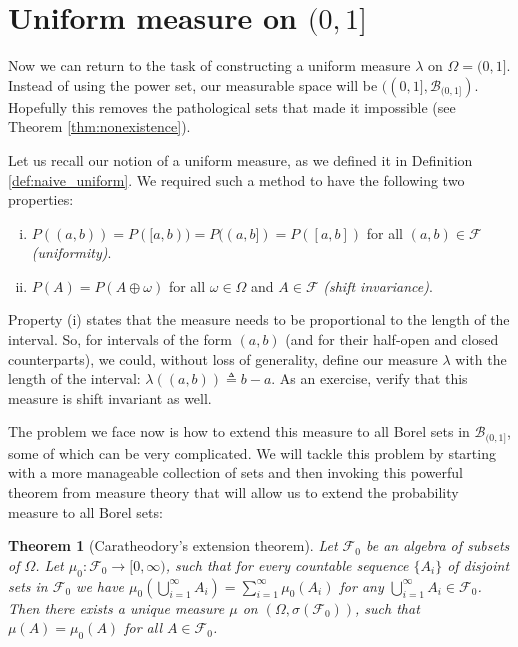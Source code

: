 \documentclass{book}
\theoremstyle{plain}%
\newtheorem{theorem}{Theorem}[section]
\theoremstyle{definition}
\newlength{\arrow}
\begin{document}
\section{Uniform measure on $(0, 1]$}

Now we can return to the task of constructing a uniform measure $\lambda$ on $\Omega = (0,1]$. Instead of using the power set, our measurable space will be $((0,1], \mathcal{B}_{(0,1]})$. Hopefully this removes the pathological sets that made it impossible (see Theorem \ref{thm:nonexistence}).

Let us recall our notion of a uniform measure, as we defined it in Definition \ref{def:naive_uniform}. We required such a method to have the following two properties:
  
\begin{enumerate}[(i)]
\item $P((a,b)) = P([a,b)) = P((a,b]) = P([a,b])$ for all $(a,b) \in \mathcal{F}$ \emph{(uniformity)}.
\item $P(A) = P(A \oplus \omega)$ for all $\omega \in \Omega$ and $A \in \mathcal{F}$ \emph{(shift invariance)}.
\end{enumerate}

Property (i) states that the measure needs to be proportional to the length of the interval. So, for intervals of the form $(a,b)$ (and for their half-open and closed counterparts), we could, without loss of generality, define our measure $\lambda$ with the length of the interval: $\lambda((a,b)) \triangleq b - a$. As an exercise, verify that this measure is shift invariant as well. 

The problem we face now is how to extend this measure to all Borel sets in $\mathcal{B}_{(0,1]}$, some of which can be very complicated. We will tackle this problem by starting with a more manageable collection of sets and then invoking this powerful theorem from measure theory that will allow us to extend the probability measure to all Borel sets:

\begin{theorem}[Caratheodory's extension theorem]
Let $\mathcal{F}_0$ be an algebra of subsets of $\Omega$. Let $\mu_0: \mathcal{F}_0 \rightarrow [0,\infty)$, such that for every countable sequence $\{A_i\}$ of disjoint sets in $\mathcal{F}_0$ we have $\mu_0(\bigcup_{i=1}^\infty A_i) = \sum_{i=1}^\infty \mu_0(A_i)$ for any $\bigcup_{i=1}^\infty A_i \in \mathcal{F}_0$. Then there exists a unique measure $\mu$ on $(\Omega, \sigma( \mathcal{F}_0 ))$, such that $\mu(A) = \mu_0(A)$ for all $A \in \mathcal{F}_0$.
\label{thm:caratheodory}
\end{theorem}
\end{document}
